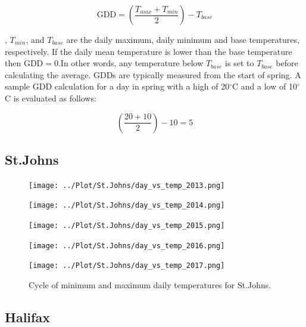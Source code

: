 \documentclass{article}
\begin{document}
\begin{equation}
\textrm{GDD} = \left(\frac{T_{max} + T_{min}}{2}\right) - T_{base}
\end{equation}

, {$T_{min}$}, and {$T_{base}$} are the daily maximum, daily minimum and base temperatures, respectively. If the daily mean temperature is lower than the base temperature then $\textrm{GDD} = 0$.In other words, any temperature below $T_{base}$ is set to $T_{base}$ before calculating the average. GDDs are typically measured from the start of spring. A sample GDD calculation for a day in spring with a high of 20$^{\circ}$C and a low of 10$^{\circ}$C is evaluated as follows:\vspace{5mm}

\[ \left(\frac {20+10}{2}\right)-10=5 \] \par

\subsection{ \bf St.Johns }





\begin{center}
\begin{figure}
\texttt{[image: ../Plot/St.Johns/day\_vs\_temp\_2013.png]}

\texttt{[image: ../Plot/St.Johns/day\_vs\_temp\_2014.png]}

\texttt{[image: ../Plot/St.Johns/day\_vs\_temp\_2015.png]}

\texttt{[image: ../Plot/St.Johns/day\_vs\_temp\_2016.png]}

\texttt{[image: ../Plot/St.Johns/day\_vs\_temp\_2017.png]}

\caption{Cycle of minimum and maximum daily temperatures for St.Johns.}
\label{gdd_min-max}
\end{figure}
\end{center}







\subsection{ \bf Halifax }
\end{document}
